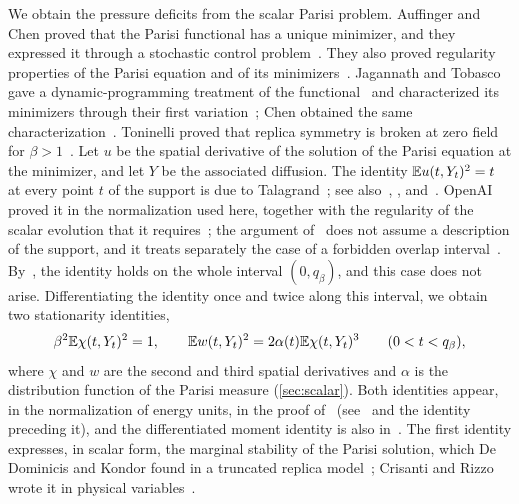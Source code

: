 We obtain the pressure deficits from the scalar Parisi problem. Auffinger and
Chen proved that the Parisi functional has a unique minimizer, and they
expressed it through a stochastic control
problem~\cite[Theorems~2 and~3 and Corollary~1]{auffinger-chen-uniqueness-2015}.
They also proved regularity properties of the Parisi equation and of its
minimizers~\cite[Propositions~1 and~2 and Theorems~1 and~2]{auffinger-chen-2015}.
Jagannath and Tobasco gave a dynamic-programming treatment of the
functional~\cite[Lemma~18]{jagannath-tobasco-2016} and characterized its
minimizers through their first
variation~\cite[Proposition~1.1 and Corollary~3.10]{jagannath-tobasco-2017};
Chen obtained the same characterization~\cite[Theorem~2 and
Proposition~1]{chen-2017}. Toninelli proved that replica symmetry is broken
at zero field for $\beta>1$~\cite{toninelli-2002}. Let $u$ be the spatial
derivative of the solution of the Parisi equation at the minimizer, and let
$Y$ be the associated diffusion. The identity $\mathbb E u(t,Y_t)^2=t$ at every
point $t$ of the support is due to
Talagrand~\cite{talagrand-2006-parisi-measures}; see
also~\cite[Theorem~5]{auffinger-chen-2015}, \cite[Proposition~1]{chen-2017},
and~\cite[Lemma~2.2]{full-rsb}. OpenAI proved it in the normalization used
here, together with the regularity of the scalar evolution that it
requires~\cite[Lemma~3.1 and Proposition~3.2]{oai-barriers}; the argument
of~\cite{oai-barriers} does not assume a description of the support, and it
treats separately the case of a forbidden overlap
interval~\cite[Section~8.2]{oai-barriers}. By~\cite[Theorem~1.1]{full-rsb}, the identity holds on the whole
interval $(0,q_\beta)$, and this case does not arise. Differentiating the
identity once and twice along this interval, we obtain two stationarity
identities,
\[
 \beta^2\mathbb E\chi(t,Y_t)^2=1,\qquad
 \mathbb E w(t,Y_t)^2=2\alpha(t)\mathbb E\chi(t,Y_t)^3\qquad(0<t<q_\beta),
\]
where $\chi$ and $w$ are the second and third spatial derivatives and
$\alpha$ is the distribution function of the Parisi measure
(\cref{sec:scalar}). Both identities appear, in the normalization of energy
units, in the proof of~\cite[Lemma~7.2]{quantitative-parisi}
(see~\cite[equation~(7.12)]{quantitative-parisi} and the identity preceding
it), and the differentiated moment identity is also
in~\cite[Lemma~2.5]{full-rsb}. The first identity expresses, in scalar form, the
marginal stability of the Parisi solution, which De Dominicis and Kondor
found in a truncated replica model~\cite{de-dominicis-kondor-1983}; Crisanti
and Rizzo wrote it in physical
variables~\cite[equations~(22) and~(23)]{crisanti-rizzo-2002}.

